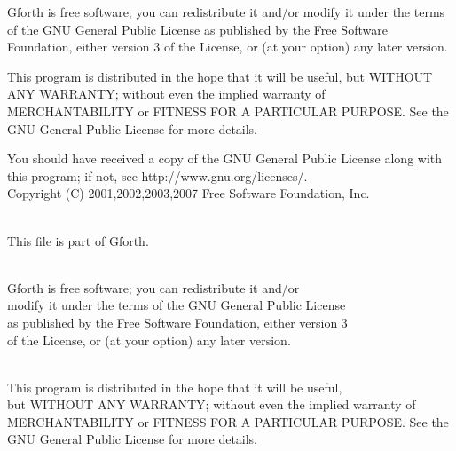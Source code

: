 \documentclass[10pt,english]{article}
\begin{document}
  Gforth is free software; you can redistribute it and/or
  modify it under the terms of the GNU General Public License
  as published by the Free Software Foundation, either version 3
  of the License, or (at your option) any later version.

  This program is distributed in the hope that it will be useful,
  but WITHOUT ANY WARRANTY; without even the implied warranty of
  MERCHANTABILITY or FITNESS FOR A PARTICULAR PURPOSE.  See the
  GNU General Public License for more details.

  You should have received a copy of the GNU General Public License
  along with this program; if not, see http://www.gnu.org/licenses/.
\nwendcode{}\nwdocspar
\nwenddocs{}\endmoddef
\\ Copyright (C) 2001,2002,2003,2007 Free Software Foundation, Inc.

\\ This file is part of Gforth.

\\ Gforth is free software; you can redistribute it and/or
\\ modify it under the terms of the GNU General Public License
\\ as published by the Free Software Foundation, either version 3
\\ of the License, or (at your option) any later version.

\\ This program is distributed in the hope that it will be useful,
\\ but WITHOUT ANY WARRANTY; without even the implied warranty of
\\ MERCHANTABILITY or FITNESS FOR A PARTICULAR PURPOSE.  See the
\\ GNU General Public License for more details.
\end{document}
